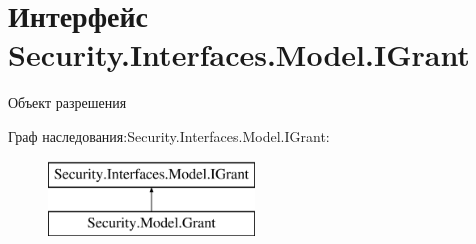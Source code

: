 \hypertarget{interface_security_1_1_interfaces_1_1_model_1_1_i_grant}{}\section{Интерфейс Security.\+Interfaces.\+Model.\+I\+Grant}
\label{interface_security_1_1_interfaces_1_1_model_1_1_i_grant}


Объект разрешения  


Граф наследования\+:Security.\+Interfaces.\+Model.\+I\+Grant\+:\begin{figure}[H]
\begin{center}
\leavevmode
\includegraphics[height=2.000000cm]{d6/df8/interface_security_1_1_interfaces_1_1_model_1_1_i_grant}
\end{center}
\end{figure}
